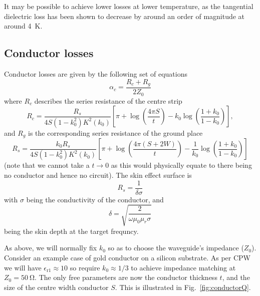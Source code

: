 \documentclass[a4paper]{article}
\begin{document}
It may be possible to achieve lower losses at lower temperature, as the
tangential dielectric loss has been shown to decrease by around an order of
magnitude at around \SI{4}{\kelvin}. \cite{1717770}

\subsection{Conductor losses}

Conductor losses are given by the following set of equations\cite{Simons2004}
\begin{equation}
  \alpha_c = \frac{R_c +R_g}{2Z_0}
\end{equation}
where $R_c$ describes the series resistance of the centre strip
\begin{equation}
  R_c = \frac{R_s}{4 S(1-k_0^2)K^2(k_0)}\left[ \pi + \log\left(\frac{4\pi
  S}{t}\right) - k_0\log\left(\frac{1+k_0}{1-k_0}\right) \right],
\end{equation}
and $R_g$ is the corresponding series resistance of the ground place
\begin{equation}
  R_s = \frac{k_0 R_s}{4S(1-k_0^2)K^2(k_0)}\left[\pi +
  \log\left(\frac{4\pi(S+2W)}{t}\right) -
  \frac{1}{k_0}\log\left(\frac{1+k_0}{1-k_0}\right)\right]
\end{equation}
(note that we cannot take a $t\to 0$ as this would physically equate to there
being no conductor and hence no circuit). The skin effect surface is
\begin{equation}
  R_s = \frac{1}{\delta\sigma}
\end{equation}
with $\sigma$ being the conductivity of the conductor, and
\begin{equation}
  \delta = \sqrt{\frac{2}{\omega\mu_0\mu_r\sigma}}
\end{equation}
being the skin depth at the target frequncy.



As above, we will normally fix $k_0$ so as to choose the waveguide's impedance
($Z_0$). Consider an example case of gold conductor on a silicon substrate. As
per CPW\cite{1127105}  we will have $\epsilon_\mathrm{r1} \approx 10$ so require $k_0
\approx 1/3$ to achieve impedance matching at $Z_0 = \SI{50}{\ohm}$. The only
free parameters are now the conductor thickness $t$, and the size of the centre
width conductor $S$. This is illustrated in Fig.~\ref{fig:conductorQ}.
\end{document}
